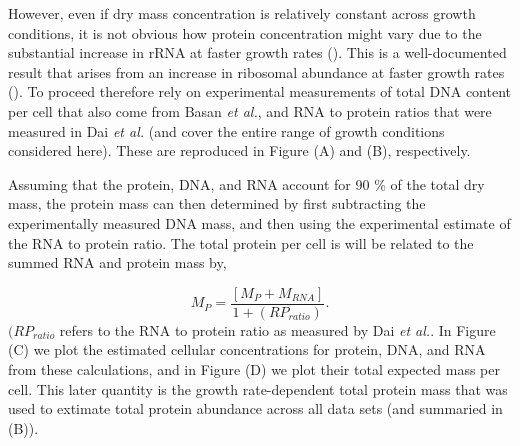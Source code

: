 However, even if dry mass concentration is relatively constant across growth
conditions, it is not obvious how protein concentration might vary due to
the substantial increase in rRNA at faster
growth rates (\cite{dai2016}). This is a well-documented result that arises from
an increase in ribosomal abundance at faster growth rates
(\cite{scott2010}). To proceed therefore rely on experimental
measurements of total DNA content per cell that also come from Basan \textit{et
al.}, and RNA to protein ratios that were measured in Dai \textit{et al.} (and
cover the entire range of growth conditions considered here). These are
reproduced in Figure (A) and (B),
respectively.

Assuming that the protein, DNA, and RNA account for 90 \% of the total dry mass,
the protein mass can then determined by first subtracting the experimentally
measured DNA mass,  and then using the experimental estimate of the RNA to
protein ratio. The total protein per cell is will be related to the summed RNA
and protein mass by,

\begin{equation}
	M_{P} = \frac{[M_P + M_{RNA}]}{1 + (RP_{ratio})}.
\end{equation}
$(RP_{ratio}$ refers to the RNA to protein ratio as measured by Dai \textit{et
al.}. In Figure (C) we plot the estimated
cellular concentrations for protein, DNA, and RNA from these calculations, and
in Figure (D) we plot their total expected
mass per cell. This later quantity is the growth rate-dependent total protein
mass that was used to extimate total protein abundance across all data sets (and
summaried in (B)).


